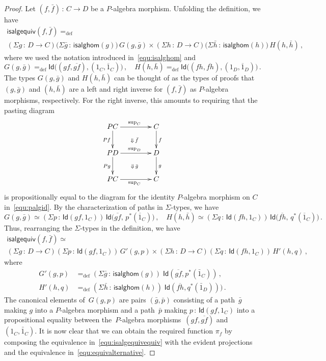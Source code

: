 \documentclass[10pt,a4paper,oneside,reqno]{amsart}
\numberwithin{equation}{section}
\theoremstyle{mythm}
\theoremstyle{mydef}
\theoremstyle{myrmk}
\newcommand{\defeq}{=_{\mathrm{def}}}
\newcommand{\co}{\,{:}\,}
\newcommand{\Id}{\mathsf{Id}}
\renewcommand{\sup}{\mathrm{sup}}
\newcommand{\isalgequiv}{\mathsf{isalgequiv}}
\begin{document}
\begin{proof} Let $(f, \bar{f}) \co C \to D$ be a $P$-algebra morphism. 
Unfolding the definition, we have
\begin{multline*}
\isalgequiv(f, \bar{f}) \defeq \\	 (\Sigma g \co D \to C) 
	 \big( \Sigma \bar{g} \co \mathsf{isalghom}(g) \big) \, 
 		G(g, \bar{g})  \times
	 (\Sigma h \co D \to C) 
	 \big(\Sigma \bar{h} \co   \mathsf{isalghom}(h) \big)
	 \,  H(h, \bar{h}) \, , 
\end{multline*}
where we used the notation introduced in~\eqref{equ:isalghom} and 
\[
G(g,\bar{g}) 
\defeq 
\Id \big( ( g  f,  \overline{gf}), (1_C, \overline{1}_C) \big)  \, , \quad 
H(h,\bar{h})     \defeq \Id \big( (   f h,  \overline{ f h}), (1_D, \overline{1}_D) \big)  \, .
\]
The types $G(g, \bar{g})$ and $H(h, \bar{h})$ can be thought of as the types of proofs that $(g, \bar{g})$ and $(h, \bar{h})$ are a left and right inverse for $(f, \bar{f})$ as 
$P$-algebra morphisms, respectively. For the right inverse, this amounts to requiring that the pasting diagram
\[
\xymatrix@C=1.5cm{
PC \ar[r]^{\sup_C} \ar[d]_{Pf}  \ar@{}[dr]|{\Downarrow \, \bar{f}} & C \ar[d]^f \\
PD \ar[r]^{\sup_D} \ar[d]_{Pg} \ar@{}[dr]|{\Downarrow \, \bar{g}} & D\ar[d]^g  \\
PC \ar[r]_{\sup_C} & C}
\]
is propositionally equal to the diagram for the identity $P$-algebra morphism on $C$ in~\eqref{equ:palgid}. 
By the characterization of paths in $\Sigma$-types, we have
\[ 
G(g, \bar{g})  \simeq (\Sigma p \co \Id(g f ,  1_C) ) \, 
	\Id\big( \overline{gf}   ,\, p^*( \overline{1}_C)  \big) \, , \quad
H(h, \bar{h})  \simeq (\Sigma q \co \Id( f h ,  1_C) ) \, 
	\Id\big( \overline{fh}   ,\, q^*( \overline{1}_C)  \big) \,. 
\]
Thus, rearranging the $\Sigma$-types in the definition, we have
\begin{multline}
\label{equ:isalgequivequiv}
\isalgequiv(f, \bar{f}) \simeq \\ 
 (\Sigma g \co D \to C)  (\Sigma p \co \Id(g f ,  1_C) ) \, G'(g,p) \times
   (\Sigma h \co D \to C)   (\Sigma q \co \Id( f h ,  1_C) )\,  H'(h,q) \, ,
\end{multline}
where 
\begin{align}
G'(g,p)  & \defeq (\Sigma \bar{g} \co \mathsf{isalghom}(g)) \; \Id( \overline{gf}, p^*(\bar{1}_C)) \, , \label{equ:alggp} \\
H'(h,q)  & \defeq (\Sigma \bar{h} \co \mathsf{isalghom}(h)) \; \Id( \overline{fh}, q^*(\bar{1}_D)) ) \, .  \label{equ:alghq}
\end{align}
The  canonical elements of~$G(g,p)$ are pairs $(\bar{g}, \bar{p})$ consisting of  a path~$\bar{g}$ making
$g$ into a $P$-algebra morphism and a path~$\bar{p}$ making $p \co \Id(gf, 1_C)$ into a propositional
equality between the~$P$-algebra morphisms~$(gf, \overline{gf})$ and~$(1_C, \bar{1}_C)$. It is now
clear that we can obtain the required function $\pi_f$ by composing the equivalence in~\eqref{equ:isalgequivequiv}
with the evident projections and the equivalence in~\eqref{equ:equivalternative}. 
\end{proof} 
\end{document}
